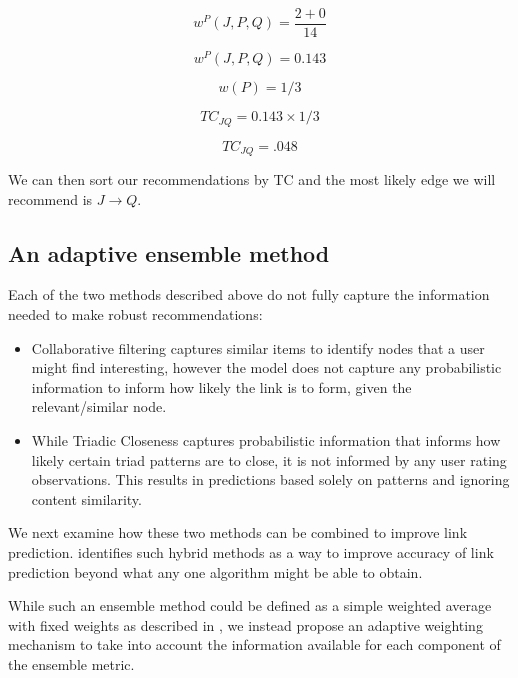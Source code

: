 \begin{equation}
w^{P}(J,P,Q) = \frac{2 + 0}{14}
\end{equation}

\begin{equation}
w^{P}(J,P,Q) = 0.143
\end{equation}

\begin{equation}
w(P)=1/3
\end{equation}

\begin{equation}
TC_{JQ} = 0.143 \times 1/3
\end{equation}

\begin{equation}
TC_{JQ} = .048
\end{equation}

We can then sort our recommendations by TC and the most likely edge we will recommend is $J \rightarrow Q$.

\subsection{An adaptive ensemble method}
Each of the two methods described above do not fully capture the information needed to make robust recommendations:
\begin{itemize}
\item Collaborative filtering captures similar items to identify nodes that a user might find interesting, however the model does not capture any probabilistic information to inform how likely the link is to form, given the relevant/similar node.
\item While Triadic Closeness captures probabilistic information that informs how likely certain triad patterns are to close, it is not informed by any user rating observations. This results in predictions based solely on patterns and ignoring content similarity.
\end{itemize}

We next examine how these two methods can be combined to improve link prediction. \cite{Lu2010} identifies such hybrid methods as a way to improve accuracy of link prediction beyond what any one algorithm might be able to obtain.

While such an ensemble method could be defined as a simple weighted average with fixed weights as described in \cite{Candillier}, we instead propose an adaptive weighting mechanism to take into account the information available for each component of the ensemble metric. 

